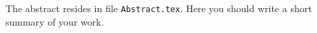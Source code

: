


The abstract resides in file \texttt{Abstract.tex}. Here you should write a short summary of your work.



